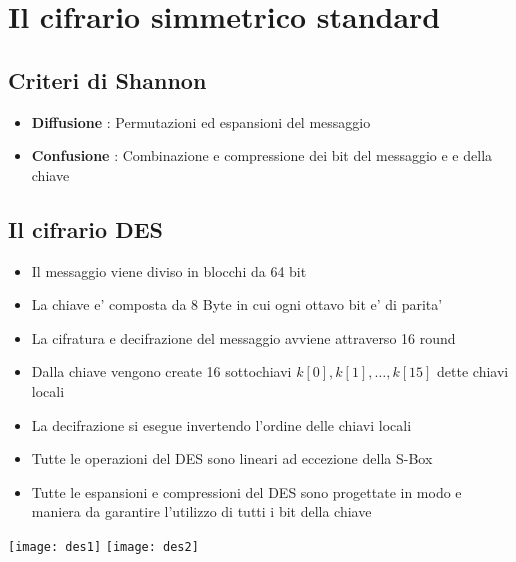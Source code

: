 \chapter{Il cifrario simmetrico standard}

\section{Criteri di Shannon}

\begin{itemize}
    \item \textbf{Diffusione} : Permutazioni ed espansioni del messaggio
    \item \textbf{Confusione} : Combinazione e compressione dei bit del messaggio e e della chiave
\end{itemize}

\section{Il cifrario DES}

\begin{itemize}
    \item Il messaggio viene diviso in blocchi da 64 bit
    \item La chiave e' composta da 8 Byte in cui ogni ottavo bit e' di parita'
    \item La cifratura e decifrazione del messaggio avviene attraverso 16 round
    \item Dalla chiave vengono create 16 sottochiavi $k[0],k[1],\dots,k[15]$ dette chiavi locali
    \item La decifrazione si esegue invertendo l'ordine delle chiavi locali
    \item Tutte le operazioni del DES sono lineari ad eccezione della S-Box
    \item Tutte le espansioni e compressioni del DES sono progettate in modo e maniera da garantire l'utilizzo di tutti i bit della chiave
\end{itemize}

\texttt{[image: des1]}
\texttt{[image: des2]}


